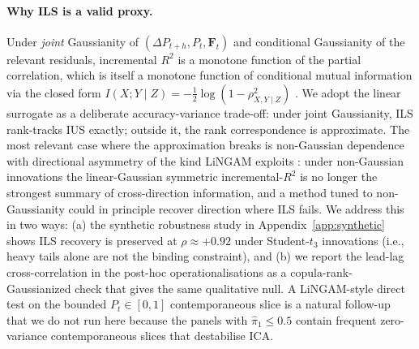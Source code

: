 \documentclass{article}
\begin{document}
\paragraph{Why ILS is a valid proxy.}
Under \emph{joint} Gaussianity of $(\Delta P_{t+h}, P_t, \mathbf{F}_t)$ and conditional Gaussianity of the relevant residuals, incremental $R^2$ is a monotone function of the partial correlation, which is itself a monotone function of conditional mutual information via the closed form $I(X;Y \mid Z) = -\tfrac{1}{2}\log(1 - \rho^2_{X,Y \mid Z})$ \citep[Ch.~8]{cover2006elements}. We adopt the linear surrogate as a deliberate accuracy-variance trade-off: under joint Gaussianity, ILS rank-tracks IUS exactly; outside it, the rank correspondence is approximate. The most relevant case where the approximation breaks is non-Gaussian dependence with directional asymmetry of the kind LiNGAM exploits \citep{shimizu2006lingam, hyvarinen2010estimation}: under non-Gaussian innovations the linear-Gaussian symmetric incremental-$R^2$ is no longer the strongest summary of cross-direction information, and a method tuned to non-Gaussianity could in principle recover direction where ILS fails. We address this in two ways: (a) the synthetic robustness study in Appendix~\ref{app:synthetic} shows ILS recovery is preserved at $\rho \approx +0.92$ under Student-$t_3$ innovations (i.e., heavy tails alone are not the binding constraint), and (b) we report the lead-lag cross-correlation in the post-hoc operationalisations as a copula-rank-Gaussianized check that gives the same qualitative null. A LiNGAM-style direct test on the bounded $P_t \in [0,1]$ contemporaneous slice is a natural follow-up that we do not run here because the panels with $\hat\pi_1 \le 0.5$ contain frequent zero-variance contemporaneous slices that destabilise ICA.
\end{document}
